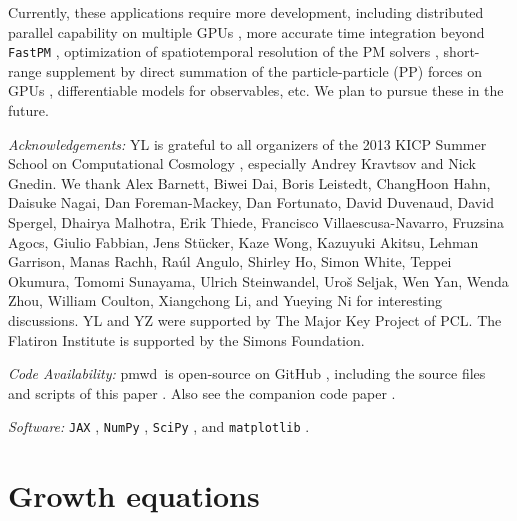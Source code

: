 \documentclass[modern, dvipsnames]{aastex631}
\newcommand{\pmwd}{{\usefont{T1}{nova}{m}{sl}pmwd}}
\begin{document}
Currently, these applications require more development, including
distributed parallel capability on multiple GPUs \citep{FlowPM}, more
accurate time integration beyond \texttt{FastPM} \citep{ListHahn2023},
optimization of spatiotemporal resolution of the PM solvers \citep{LDL,
LanzieriLanusseEtAl2022, ZhangLiEtAl}, short-range supplement by direct
summation of the particle-particle (PP) forces on GPUs \citep{HACC,
PKDGRAV3, ABACUS}, differentiable models for observables, etc.
We plan to pursue these in the future.



\vspace{1em}
\textit{\large Acknowledgements:}
YL is grateful to all organizers of the 2013 KICP Summer School on
Computational Cosmology \citep{KICPsummer2013}, especially Andrey
Kravtsov and Nick Gnedin.
We thank Alex Barnett, Biwei Dai, Boris Leistedt, ChangHoon Hahn,
Daisuke Nagai, Dan Foreman-Mackey, Dan Fortunato, David Duvenaud, David
Spergel, Dhairya Malhotra, Erik Thiede, Francisco Villaescusa-Navarro,
Fruzsina Agocs, Giulio Fabbian, Jens St\"ucker, Kaze Wong, Kazuyuki
Akitsu, Lehman Garrison, Manas Rachh, Ra\'ul Angulo, Shirley Ho, Simon
White, Teppei Okumura, Tomomi Sunayama, Ulrich Steinwandel, Uro\v{s}
Seljak, Wen Yan, Wenda Zhou, William Coulton, Xiangchong Li, and Yueying
Ni for interesting discussions.
YL and YZ were supported by The Major Key Project of PCL.
The Flatiron Institute is supported by the Simons Foundation.


\vspace{1em}
\textit{\large Code Availability:}
\pmwd\ is open-source on GitHub
\href{https://github.com/eelregit/pmwd}{\faGithub}, including the source
files and scripts of this paper
\href{https://github.com/eelregit/pmwd/tree/master/docs/papers/adjoint}{\faFile}.
Also see the companion code paper \citep{pmwd}
\href{https://github.com/eelregit/pmwd/tree/master/docs/papers/pmwd}{\faFile}.


\vspace{1em}
\textit{\large Software:}
\texttt{JAX} \citep{JAX}, \texttt{NumPy} \citep{NumPy}, \texttt{SciPy}
\citep{SciPy}, and \texttt{matplotlib} \citep{matplotlib}.



\vspace{1em}
\appendix


\vspace{1em}
\section{Growth equations}
\label{app:growth}
\end{document}
